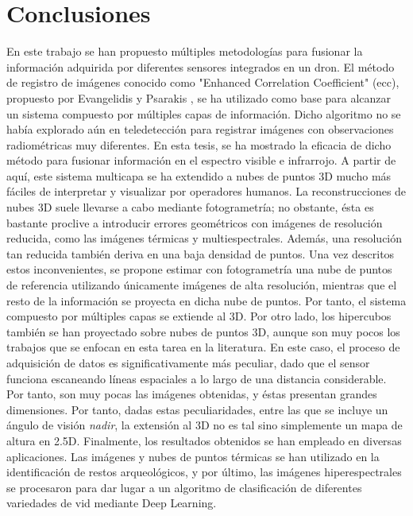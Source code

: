 \setchapterpreamble[u]{\margintoc}
\chapter{Conclusiones}
\label{sec:conclusions_spanish}

En este trabajo se han propuesto múltiples metodologías para fusionar la información adquirida por diferentes sensores integrados en un dron. El método de registro de imágenes conocido como "Enhanced Correlation Coefficient" (\acrshort{ecc}), propuesto por Evangelidis y Psarakis \cite{evangelidis_parametric_2008}, se ha utilizado como base para alcanzar un sistema compuesto por múltiples capas de información. Dicho algoritmo no se había explorado aún en teledetección para registrar imágenes con observaciones radiométricas muy diferentes. En esta tesis, se ha mostrado la eficacia de dicho método para fusionar información en el espectro visible e infrarrojo. A partir de aquí, este sistema multicapa se ha extendido a nubes de puntos 3D mucho más fáciles de interpretar y visualizar por operadores humanos. La reconstrucciones de nubes 3D suele llevarse a cabo mediante fotogrametría; no obstante, ésta es bastante proclive a introducir errores geométricos con imágenes de resolución reducida, como las imágenes térmicas y multiespectrales. Además, una resolución tan reducida también deriva en una baja densidad de puntos. Una vez descritos estos inconvenientes, se propone estimar con fotogrametría una nube de puntos de referencia utilizando únicamente imágenes de alta resolución, mientras que el resto de la información se proyecta en dicha nube de puntos. Por tanto, el sistema compuesto por múltiples capas se extiende al 3D. Por otro lado, los hipercubos también se han proyectado sobre nubes de puntos 3D, aunque son muy pocos los trabajos que se enfocan en esta tarea en la literatura. En este caso, el proceso de adquisición de datos es significativamente más peculiar, dado que el sensor funciona escaneando líneas espaciales a lo largo de una distancia considerable. Por tanto, son muy pocas las imágenes obtenidas, y éstas presentan grandes dimensiones. Por tanto, dadas estas peculiaridades, entre las que se incluye un ángulo de visión \textit{nadir}, la extensión al 3D no es tal sino simplemente un mapa de altura en 2.5D. Finalmente, los resultados obtenidos se han empleado en diversas aplicaciones. Las imágenes y nubes de puntos térmicas se han utilizado en la identificación de restos arqueológicos, y por último, las imágenes hiperespectrales se procesaron para dar lugar a un algoritmo de clasificación de diferentes variedades de vid mediante Deep Learning.

